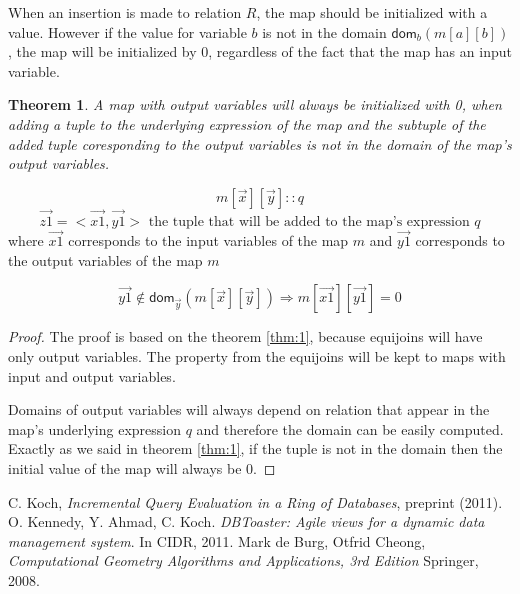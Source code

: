 \documentclass[12pt]{article}
\newtheorem{theorem}{Theorem}
\newcommand{\dom}{\textsf{dom}}
\begin{document}
When an insertion is made to relation $R$, the map should be initialized with a value. However if the value for variable $b$ is not in the domain $\dom{}_{b}(m[a][b])$, the map will be initialized by 0, regardless of the fact that the map has an input variable.

\begin{theorem}
A map with output variables will always be initialized with 0, when adding a tuple to the underlying expression of the map and the subtuple of the added tuple coresponding to the output variables is not in the domain of the map's output variables. 
\end{theorem}
$$m[\vec{x}][\vec{y}]::q$$
$$\vec{z1}=<\vec{x1},\vec{y1}>\mbox{ the tuple that will be added to the map's expression } q$$
where $\vec{x1}$ corresponds to the input variables of the map $m$ and $\vec{y1}$ corresponds to the output variables of the map $m$

$$\vec{y1}\notin\dom{}_{\vec{y}}(m[\vec{x}][\vec{y}])\Rightarrow m[\vec{x1}][\vec{y1}]=0$$

\begin{proof}
The proof is based on the theorem \ref{thm:1}, because equijoins will have only output variables. The property from the equijoins will be kept to maps with input and output variables.

Domains of output variables will always depend on relation that appear in the map's underlying expression $q$ and therefore the domain can be easily computed. Exactly as we said in theorem \ref{thm:1}, if the tuple is not in the domain then the initial value of the map will always be 0.
\end{proof}

\begin{thebibliography}{9}
 C. Koch, \emph{Incremental Query Evaluation in a Ring of Databases},  preprint (2011).
 O. Kennedy, Y. Ahmad, C. Koch. \emph{DBToaster: Agile views for a dynamic data management system}. In CIDR, 2011.
 Mark de Burg, Otfrid Cheong, \emph{Computational Geometry Algorithms and Applications, 3rd Edition} Springer, 2008.
\end{thebibliography}
\end{document}
